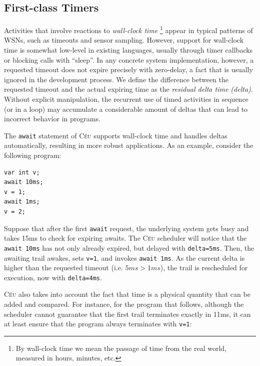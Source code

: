\documentclass[letterpaper]{sig-alternate}
\newcommand{\code}[1] {{\small{\texttt{#1}}}}
\newcommand{\CEU}{\textsc{C\'{e}u}\xspace}
\begin{document}
\subsection{First-class Timers}
\label{sec.ceu.wclocks}


Activities that involve reactions to \emph{wall-clock time}%
\footnote{
By wall-clock time we mean the passage of time from the real world, measured in 
hours, minutes, etc.
}
appear in typical patterns of WSNs, such as timeouts and sensor sampling.
However, support for wall-clock time is somewhat low-level in existing 
languages, usually through timer callbacks or blocking calls with ``sleep''.
%
In any concrete system implementation, however, a requested timeout does not 
expire precisely with zero-delay, a fact that is usually ignored in the 
development process.
We define the difference between the requested timeout and the actual expiring 
time as the \emph{residual delta time (delta)}.
Without explicit manipulation, the recurrent use of timed activities in 
sequence (or in a loop) may accumulate a considerable amount of deltas that can 
lead to incorrect behavior in programs.

The \code{await} statement of \CEU supports wall-clock time and handles deltas 
automatically, resulting in more robust applications.
As an example, consider the following program:

\nopagebreak
\noindent
\begin{minipage}{\linewidth}
\begin{lstlisting}[xleftmargin=2em]
var int v;
await 10ms;
v = 1;
await 1ms;
v = 2;
\end{lstlisting}
\end{minipage}

Suppose that after the first \code{await} request, the underlying system gets 
busy and takes 15ms to check for expiring awaits.
The \CEU scheduler will notice that the \code{await 10ms} has not only already 
expired, but delayed with \code{delta=5ms}.
Then, the awaiting trail awakes, sets \code{v=1}, and invokes \code{await 1ms}.
As the current delta is higher than the requested timeout (i.e. $5ms > 1ms$), 
the trail is rescheduled for execution, now with \code{delta=4ms}.

\CEU also takes into account the fact that time is a physical quantity that can 
be added and compared.
For instance, for the program that follows, although the scheduler cannot 
guarantee that the first trail terminates exactly in 11ms, it can at least 
ensure that the program always terminates with \code{v=1}:
\end{document}
